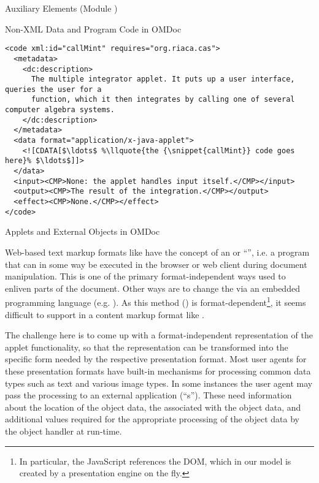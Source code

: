 \begin{tchapter}[id=ext,short=Auxiliary Elements]{Auxiliary Elements (Module {})}
\begin{tsection}[id=private]{Non-XML Data and Program Code in OMDoc}
\begin{lstlisting}[label=lst:callMint,mathescape,escapechar=\%,
  caption={The Program Code for a Java Applet},
  index={code,input,output,effect,data}]
<code xml:id="callMint" requires="org.riaca.cas"> 
  <metadata>
    <dc:description>
      The multiple integrator applet. It puts up a user interface, queries the user for a 
      function, which it then integrates by calling one of several computer algebra systems. 
    </dc:description>
  </metadata>
  <data format="application/x-java-applet">
    <![CDATA[$\ldots$ %\llquote{the {\snippet{callMint}} code goes here}% $\ldots$]]>
  </data> 
  <input><CMP>None: the applet handles input itself.</CMP></input> 
  <output><CMP>The result of the integration.</CMP></output>
  <effect><CMP>None.</CMP></effect> 
</code>
\end{lstlisting}
\end{tsection}

\begin{tsection}[id=applets]{Applets and External Objects in OMDoc}
  
  Web-based text markup formats like {\html} have the concept of an
  {} or ``{}'', i.e.  a program that can in
  some way be executed in the browser or web client during document manipulation. This is
  one of the primary format-independent ways used to enliven parts of the document.  Other
  ways are to change the {} via an embedded programming
  language (e.g.  {}). As this method ({}) is
  format-dependent\footnote{In particular, the JavaScript references the {\html} DOM,
    which in our model is created by a presentation engine on the fly.}, it seems
  difficult to support in a content markup format like {\omdoc}.
  
  The challenge here is to come up with a format-independent representation of the applet
  functionality, so that the {\omdoc} representation can be transformed into the specific
  form needed by the respective presentation format.  Most user agents for these
  presentation formats have built-in mechanisms for processing common data types such as
  text and various image types. In some instances the user agent may pass the processing
  to an external application (``{s}'').  These need information about
  the location of the object data, the {} associated with the object
  data, and additional values required for the appropriate processing of the object data
  by the object handler at run-time.


\end{tsection}
\end{tchapter}
